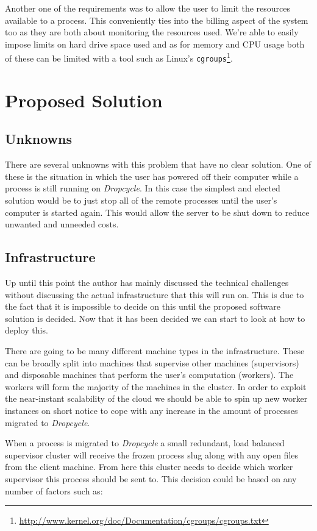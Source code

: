 \documentclass[12pt, a4paper]{article}
\begin{document}
Another one of the requirements was to allow the user to limit the resources
available to a process. This conveniently ties into the billing aspect of the
system too as they are both about monitoring the resources used. We're able to
easily impose limits on hard drive space used and as for memory and CPU usage
both of these can be limited with a tool such as Linux's
\texttt{cgroups}\footnote{\url{http://www.kernel.org/doc/Documentation/cgroups/cgroups.txt}}.

\section{Proposed Solution}

\subsection{Unknowns}

There are several unknowns with this problem that have no clear solution. One
of these is the situation in which the user has powered off their computer
while a process is still running on \emph{Dropcycle}. In this case the simplest
and elected solution would be to just stop all of the remote processes until
the user's computer is started again. This would allow the server to be shut
down to reduce unwanted and unneeded costs.

\subsection{Infrastructure}

Up until this point the author has mainly discussed the technical challenges
without discussing the actual infrastructure that this will run on. This is due
to the fact that it is impossible to decide on this until the proposed software
solution is decided. Now that it has been decided we can start to look at how
to deploy this.

There are going to be many different machine types in the infrastructure. These
can be broadly split into machines that supervise other machines (supervisors)
and disposable machines that perform the user's computation (workers). The
workers will form the majority of the machines in the cluster. In order to
exploit the near-instant scalability of the cloud we should be able to spin up
new worker instances on short notice to cope with any increase in the amount of
processes migrated to \emph{Dropcycle}.

When a process is migrated to \emph{Dropcycle} a small redundant, load balanced
supervisor cluster will receive the frozen process slug along with any open
files from the client machine. From here this cluster needs to decide which
worker supervisor this process should be sent to. This decision could be based
on any number of factors such as:
\end{document}
